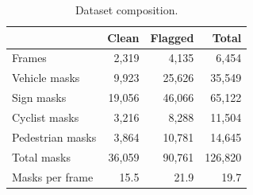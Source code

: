\begin{table}[h]
\centering
\caption{Dataset composition.}
\label{tab:dataset}
\begin{tabular}{lrrr}
\toprule
 & \textbf{Clean} & \textbf{Flagged} & \textbf{Total} \\
\midrule
Frames           & 2{,}319  & 4{,}135  & 6{,}454   \\
Vehicle masks    & 9{,}923  & 25{,}626 & 35{,}549  \\
Sign masks       & 19{,}056 & 46{,}066 & 65{,}122  \\
Cyclist masks    & 3{,}216  & 8{,}288  & 11{,}504  \\
Pedestrian masks & 3{,}864  & 10{,}781 & 14{,}645  \\
Total masks      & 36{,}059 & 90{,}761 & 126{,}820 \\
Masks per frame  & 15.5     & 21.9     & 19.7      \\
\bottomrule
\end{tabular}
\end{table}
